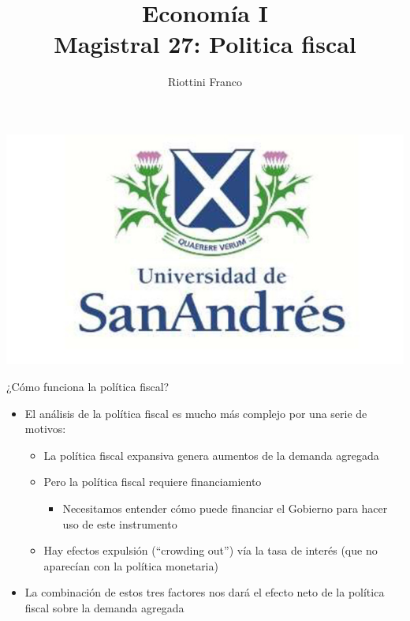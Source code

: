 \documentclass{beamer}
\title[Economía I]{Economía I \vspace{4mm}
\\ Magistral 27: Politica fiscal}
\date{}
\author[Riottini]{Riottini Franco}
\institute[]{Universidad de San Andrés}
\begin{document}
\begin{frame}
\titlepage
\centering

\includegraphics[scale=0.2]{../Figures/logoUDESA.jpg} 
\end{frame}

\begin{frame}{¿Cómo funciona la política fiscal?}
    \begin{itemize}
        \item El análisis de la política fiscal es mucho más complejo por una serie de motivos:
        \begin{itemize}
            \item La política fiscal expansiva genera aumentos de la demanda agregada 
            \item Pero la política fiscal requiere financiamiento
            \begin{itemize}
                \item Necesitamos entender cómo puede financiar el Gobierno para hacer uso de este instrumento
            \end{itemize}
            \item Hay efectos expulsión (“crowding out”) vía la tasa de interés (que no aparecían con la política monetaria)
        \end{itemize}
        \item La combinación de estos tres factores nos dará el efecto neto de la política fiscal sobre la demanda agregada
    \end{itemize}
\end{frame}
\end{document}
